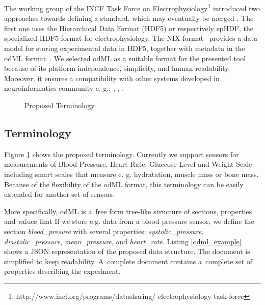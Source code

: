 \documentclass[a4paper,twoside]{article}
\begin{document}
The working group of the INCF Task Force on Electrophysiology\footnote{http://www.incf.org/programs/datasharing/ electrophysiology-task-force} introduced two approaches towards defining a standard, which may eventually be merged \cite{10.3389/conf.fninf.2013.09.00069}. The first one uses the Hierarchical Data Format (HDF5) \cite{hdf5} or respectively epHDF, the  specialized HDF5 format for electrophysiology. The NIX format~\cite{Stoewer:2014} provides a data model for storing experimental data in HDF5, together with metadata in the odML format~\cite{10.3389/fninf.2011.00016}. We selected odML as a suitable format for the presented tool because of its platform-independence, simplicity, and human-readability. Moreover, it ensures a compatibility with other systems developed in neuroinformatics community e. g.: \cite{10.3389/conf.fninf.2014.18.00029}, \cite{10.3389/conf.fninf.2014.18.00053}, \cite{10.3389/conf.fninf.2013.09.00025}.

\begin{figure}

  \centering
   {}
  \caption{Proposed Terminology}
  \label{fig:Terminology}
 \end{figure}


\subsection{Terminology}

Figure \ref{fig:Terminology} shows the proposed terminology. Currently we support sensors for measurements of Blood Pressure, Heart Rate, Gluccose Level and Weight Scale including smart scales that measure e. g. hydratation, muscle mass or bone mass. Because of the flexibility of the odML format, this terminology can be easily extended for another set of sensors.


More specifically, odML is a~free form tree-like structure of sections, properties and values that  If we store e.g. data from a blood pressure sensor, we define the section \emph{blood\_presure} with several properties: \textit{systolic\_pressure}, \textit{diastolic\_pressure}, \textit{mean\_pressure}, and \textit{heart\_rate}. Listing \ref{odml_example} shows a JSON representation of the proposed data structure. The document is simplified to keep readability. A~complete document contains a~complete set of properties describing the experiment.
\end{document}

